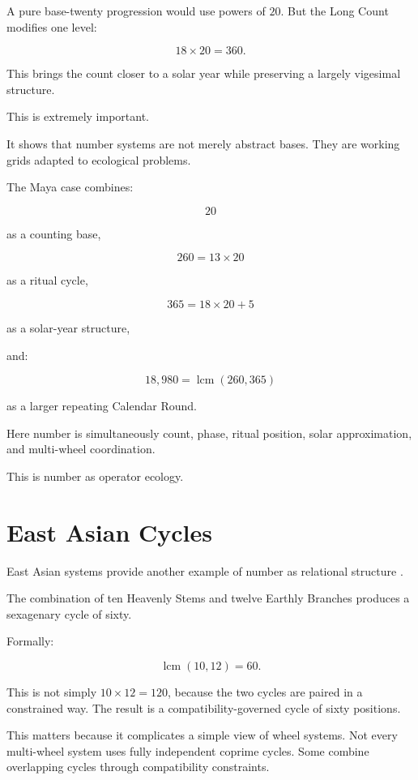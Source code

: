 \documentclass[11pt]{book}
\begin{document}
A pure base-twenty progression would use powers of \(20\). But the Long Count modifies one level:

\[
18 \times 20 = 360.
\]

This brings the count closer to a solar year while preserving a largely vigesimal structure.

This is extremely important.

It shows that number systems are not merely abstract bases. They are working grids adapted to ecological problems.

The Maya case combines:

\[
20
\]

as a counting base,

\[
260 = 13 \times 20
\]

as a ritual cycle,

\[
365 = 18 \times 20 + 5
\]

as a solar-year structure,

and:

\[
18{,}980 = \operatorname{lcm}(260,365)
\]

as a larger repeating Calendar Round.

Here number is simultaneously count, phase, ritual position, solar approximation, and multi-wheel coordination.

This is number as operator ecology.

\section{East Asian Cycles}

East Asian systems provide another example of number as relational structure \cite{Needham1959ScienceCivilisationChina3,Loewe1994DivinationMythologyMonarchy,Nylan2001FiveConfucianClassics}.

The combination of ten Heavenly Stems and twelve Earthly Branches produces a sexagenary cycle of sixty.

Formally:

\[
\operatorname{lcm}(10,12)=60.
\]

This is not simply \(10 \times 12 = 120\), because the two cycles are paired in a constrained way. The result is a compatibility-governed cycle of sixty positions.

This matters because it complicates a simple view of wheel systems. Not every multi-wheel system uses fully independent coprime cycles. Some combine overlapping cycles through compatibility constraints.
\end{document}
